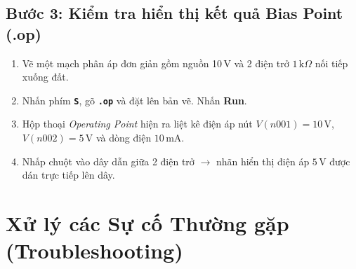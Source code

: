\documentclass[11pt,a4paper]{article}
\newcommand{\code}[1]{\texttt{\color{navy}\textbf{#1}}}
\newcommand{\key}[1]{\colorbox{gray!20}{\texttt{\textbf{#1}}}}
\begin{document}
\subsection{Bước 3: Kiểm tra hiển thị kết quả Bias Point (.op)}
\begin{enumerate}[itemsep=2pt]
  \item Vẽ một mạch phân áp đơn giản gồm nguồn 10\,V và 2 điện trở $1\,\text{k}\Omega$ nối tiếp xuống đất.
  \item Nhấn phím \key{S}, gõ \code{.op} và đặt lên bản vẽ. Nhấn \textbf{Run}.
  \item Hộp thoại \textit{Operating Point} hiện ra liệt kê điện áp nút $V(n001)=10\,\text{V}$, $V(n002)=5\,\text{V}$ và dòng điện $10\,\text{mA}$.
  \item Nhấp chuột vào dây dẫn giữa 2 điện trở $\rightarrow$ nhãn hiển thị điện áp $5\,\text{V}$ được dán trực tiếp lên dây.
\end{enumerate}

\section{Xử lý các Sự cố Thường gặp (Troubleshooting)}
\end{document}
